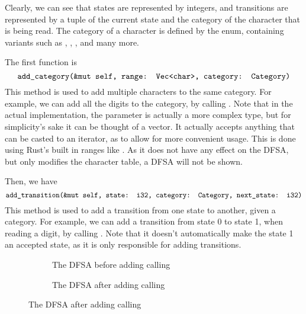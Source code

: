 Clearly, we can see that states are represented by  integers, and
transitions are represented by a tuple of the current state and the category of
the character that is being read. The category of a character is defined by the
 enum, containing variants such as , ,
, and many more.


The first function is $$\texttt{add\_category(\&mut self, range: Vec<char>,
        category: Category)}$$  This method is used to add multiple characters to the
same category.  For example, we can add all the digits to the 
category, by calling . Note that
in the actual implementation, the  parameter is actually a more
complex type, but for simplicity's sake it can be thought of a vector. It
actually accepts anything that can be casted to an iterator, as to allow for
more convenient usage. This is done using Rust's built in ranges like
. As it does not have any effect on the DFSA, but only modifies
the character table, a DFSA will not be shown.

Then, we have $$\texttt{add\_transition(\&mut self, state: i32, category:
        Category, next\_state: i32)}$$ This method is used to add a transition from one
state to another, given a category. For example, we can add a transition from
state 0 to state 1, when reading a digit, by calling . Note that it doesn't automatically make the state 1 an
accepted state, as it is only responsible for adding transitions.


\begin{figure}[H]
    \begin{subfigure}[t]{0.5\textwidth}
        \centering
        \caption{The DFSA before adding calling }
    \end{subfigure}
    \begin{subfigure}[t]{0.5\textwidth}
        \centering

        \caption{The DFSA after adding calling }
    \end{subfigure}
\end{figure}

